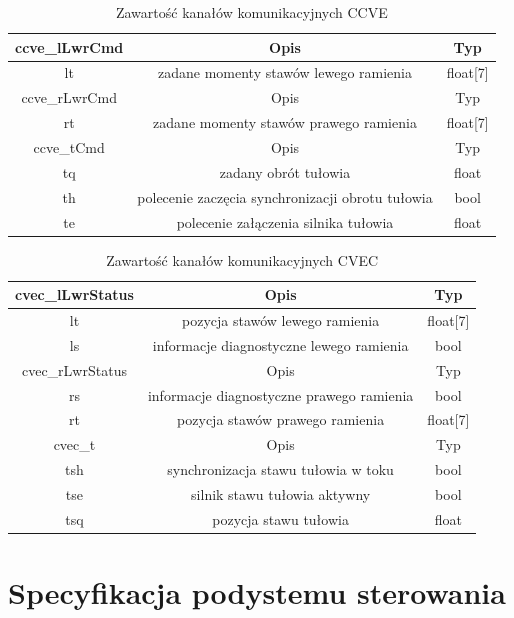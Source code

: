 \documentclass[]{article}
\begin{document}
\begin{table}[H]
	\begin{tabular}{||c|cc||}
		\hline\hline
		ccve\_lLwrCmd & Opis & Typ \\
		\hline\hline

		lt & zadane momenty stawów lewego ramienia & float[7] \\
		\hline\hline
		ccve\_rLwrCmd & Opis & Typ \\
		\hline\hline

		rt & zadane momenty stawów prawego ramienia & float[7] \\
		\hline\hline
		ccve\_tCmd & Opis & Typ \\
		\hline\hline
		tq & zadany obrót tułowia & float \\
		th & polecenie zaczęcia synchronizacji obrotu tułowia & bool \\
		te & polecenie załączenia silnika tułowia & float \\
		\hline
	\end{tabular}
	\caption{Zawartość kanałów komunikacyjnych CCVE}
	\label{tab:ccve}
\end{table}

\begin{table}[H]
	\begin{tabular}{||c|cc||}
		\hline\hline
		cvec\_lLwrStatus & Opis & Typ \\
		\hline\hline
		lt & pozycja stawów lewego ramienia & float[7] \\
		ls & informacje diagnostyczne lewego ramienia & bool \\
		\hline\hline
		cvec\_rLwrStatus & Opis & Typ \\
		\hline\hline
		rs & informacje diagnostyczne prawego ramienia & bool \\
		rt & pozycja stawów prawego ramienia & float[7] \\
		\hline\hline
		cvec\_t & Opis & Typ \\
		\hline\hline
		tsh & synchronizacja stawu tułowia w toku & bool \\
		tse & silnik stawu tułowia aktywny & bool \\
		tsq & pozycja stawu tułowia & float \\
		\hline
	\end{tabular}
	\caption{Zawartość kanałów komunikacyjnych CVEC}
	\label{tab:cvec}
\end{table}


\section{Specyfikacja podystemu sterowania}
\end{document}
